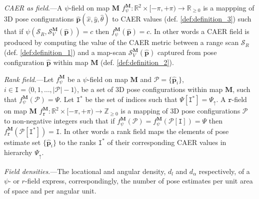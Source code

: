 \begin{definition}
  \label{def:definition_4} \textit{CAER as field}.---A $\psi$-field on map
  $\bm{M}$
  $f_{\psi}^{\bm{M}} : \mathbb{R}^2 \times [-\pi, +\pi) \rightarrow \mathbb{R}_{\geq 0}$
  is a mappping of 3D pose configurations
  $\hat{\bm{p}}(\hat{x},\hat{y},\hat{\theta})$ to CAER values (def.
  \ref{def:definition_3}) such that if
  $\psi(\mathcal{S}_R,\mathcal{S}_V^{\bm{M}}(\hat{\bm{p}})) = c$ then
  $f_{\psi}^{\bm{M}}(\hat{\bm{p}}) = c$. In other words a CAER field is
  produced by computing the value of the CAER metric between a range scan
  $\mathcal{S}_R$ (def. \ref{def:definition_1}) and a map-scan
  $\mathcal{S}_V^{\bm{M}}(\hat{\bm{p}})$ captured from pose configuration
  $\hat{\bm{p}}$ within map $\bm{M}$ (def. \ref{def:definition_2}).
\end{definition}

\begin{definition}
  \label{def:definition_5} \textit{Rank field}.---Let $f_{\psi}^{\bm{M}}$ be
  a $\psi$-field on map $\bm{M}$ and $\mathcal{P} = \{\hat{\bm{p}}_i\}$,
  $i \in \texttt{I} = \langle 0,1,\dots,|\mathcal{P}|-1 \rangle$, be a set of 3D pose
  configurations within map $\bm{M}$, such that
  $f_{\psi}^{\bm{M}}(\mathcal{P}) = \Psi$. Let $\texttt{I}^{\ast}$
  be the set of indices such that $\Psi[\texttt{I}^{\ast}] = \Psi_\uparrow$.
  A $\texttt{r}$-field on map $\bm{M}$
  $f_{\texttt{r}}^{\bm{M}} : \mathbb{R}^2 \times [-\pi, +\pi) \rightarrow \mathbb{Z}_{\geq 0}$
  is a mapping of 3D pose configurations $\mathcal{P}$ to non-negative integers
  such that if $f_{\psi}^{\bm{M}}(\mathcal{P}) = f_{\psi}^{\bm{M}}(\mathcal{P}[\texttt{I}]) = \Psi$ then
  $f_{\texttt{r}}^{\bm{M}}(\mathcal{P}[\texttt{I}^\ast]) = \texttt{I}$.
  In other words a rank field maps the elements of pose estimate set $\{\hat{\bm{p}}_i\}$
  to the ranks $\texttt{I}^\ast$ of their corresponding CAER values in
  hierarchy $\Psi_\uparrow$.
\end{definition}

\begin{definition}
  \label{def:definition_6} \textit{Field densities}.---The locational and
  angular density, $d_l$ and $d_{\alpha}$ respectively, of a
  $\psi$- or $r$-field express, correspondingly, the number of pose estimates
  per unit area of space and per angular unit.
\end{definition}


